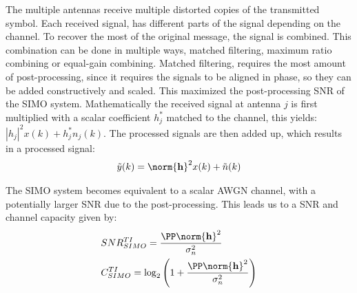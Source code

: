 The multiple antennas receive multiple distorted copies of the transmitted symbol. Each received signal, has different parts of the signal depending on the channel. To recover the most of the original message, the signal is combined. This combination can be done in multiple ways, matched filtering, maximum ratio combining or equal-gain combining. Matched filtering, requires the most amount of post-processing, since it requires the signals to be aligned in phase, so they can be added constructively and scaled. This maximized the post-processing SNR of the SIMO system. Mathematically the received signal at antenna $j$ is first multiplied with a scalar coefficient $h_j^*$ matched to the channel, this yields: $|h_j|^2 x(k) + h_j^* n_j(k)$. The processed signals are then added up, which results in a processed signal\cite{Tim2012Practical}: 
\begin{align*}
  \tilde{y}(k) = \norm{\mathbf{h}}^2 x(k) + \tilde{n}(k)
\end{align*}

The SIMO system becomes equivalent to a scalar AWGN channel, with a potentially larger SNR due to the post-processing\cite{Tim2012Practical}. This leads us to a SNR and channel capacity given by\cite{Tim2012Practical}: 
\begin{align*}
&SNR^{TI}_{SIMO} = \frac{\PP \norm{\mathbf{h}}^2}{\sigma^2_n} \\
&C^{TI}_{SIMO} = \log_2 \left( 1+\frac{\PP \norm{\mathbf{h}}^2}{\sigma^2_n} \right)  
\end{align*}

